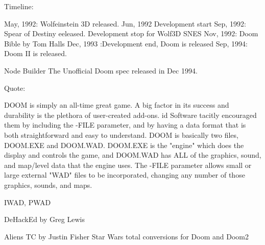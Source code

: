 Timeline:

May, 1992: Wolfeinstein 3D released.
Jun, 1992 Development start
Sep, 1992: Spear of Destiny eeleased.
Development stop for Wolf3D SNES
Nov, 1992: Doom Bible by Tom Halls
Dec, 1993 :Development end, Doom is released
Sep, 1994: Doom II is released.




Node Builder
The Unofficial Doom spec released in Dec 1994. 

Quote:

DOOM is simply an all-time great game. A big factor in its success
and durability is the plethora of user-created add-ons. id Software
tacitly encouraged them by including the -FILE parameter, and by having
a data format that is both straightforward and easy to understand.
DOOM is basically two files, DOOM.EXE and DOOM.WAD. DOOM.EXE is the
"engine" which does the display and controls the game, and DOOM.WAD has
ALL of the graphics, sound, and map/level data that the engine uses.
The -FILE parameter allows small or large external "WAD" files to be
incorporated, changing any number of those graphics, sounds, and maps.

IWAD, PWAD


DeHackEd by Greg Lewis


Aliens TC by Justin Fisher
Star Wars total conversions for Doom and Doom2
 